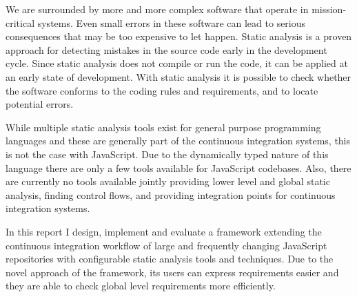 We are surrounded by more and more complex software that operate in mission-critical systems. Even small errors in these software can lead to serious consequences that may be too expensive to let happen. Static analysis is a proven approach for detecting mistakes in the source code early in the development cycle. Since static analysis does not compile or run the code, it can be applied at an early state of development. With static analysis it is possible to check whether the software conforms to the coding rules and requirements, and to locate potential errors.

While multiple static analysis tools exist for general purpose programming languages and these are generally part of the continuous integration systems, this is not the case with JavaScript. Due to the dynamically typed nature of this language there are only a few tools available for JavaScript codebases. Also, there are currently no tools available jointly providing lower level and global static analysis, finding control flows, and providing integration points for continuous integration systems.

In this report I design, implement and evaluate a framework extending the continuous integration workflow of large and frequently changing JavaScript repositories with configurable static analysis tools and techniques. Due to the novel approach of the framework, its users can express requirements easier and they are able to check global level requirements more efficiently.

\clearpage
